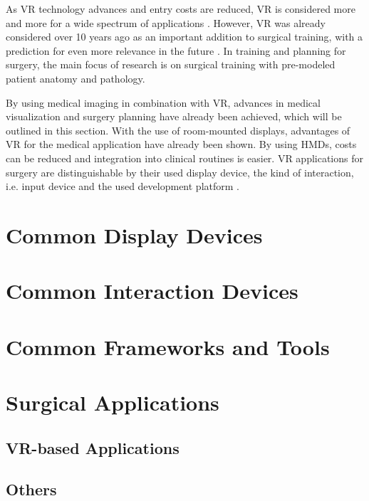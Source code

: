 As VR technology advances and entry costs are reduced, VR is considered more and more for a wide spectrum of applications \cite{Ayoub.2019, Berni.2020}.
However, VR was already considered over 10 years ago as an important addition to surgical training, with a prediction for even more relevance in the future \cite{RN60}.
In training and planning for surgery, the main focus of research is on surgical training with pre-modeled patient anatomy and pathology.

By using medical imaging in combination with VR, advances in medical visualization and surgery planning have already been achieved, which will be outlined in this section.
With the use of room-mounted displays, advantages of VR for the medical application have already been shown.
By using HMDs, costs can be reduced and integration into clinical routines is easier.
VR applications for surgery are distinguishable by their used display device, the kind of interaction, i.e. input device and the used development platform \cite{Vaughan.2016}.

\section{\label{sec::DisplayDevices}Common Display Devices}


\section{\label{sec::InteractionDevices}Common Interaction Devices}%


\section{\label{sec::FrameworksAndTools}Common Frameworks and Tools}


\section{\label{sec::SurgicalApplications}Surgical Applications}

\subsection{\label{sec::VRBasedApplications}VR-based Applications}


\subsection{\label{sec::Others}Others}%

